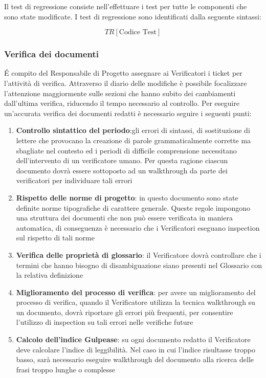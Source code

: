 Il test di regressione consiste nell’effettuare i test per tutte le
componenti che sono state modificate. I test di regressione sono
identificati dalla seguente sintassi: 

$$ TR[\text{Codice Test}] $$ 

\subsubsection{Verifica dei documenti}

\'E compito del Responsabile di Progetto assegnare ai Verificatori i ticket per l'attività di verifica. Attraverso il diario delle modifiche è possibile focalizzare l’attenzione maggiormente sulle sezioni che hanno subito dei cambiamenti dall’ultima verifica, riducendo il tempo necessario al controllo.
Per eseguire un’accurata verifica dei documenti redatti è necessario seguire i seguenti
punti:
\begin{enumerate}
	\item \textbf{Controllo sintattico del periodo}:gli errori di sintassi, di sostituzione di lettere che provocano la creazione di parole grammaticalmente corrette ma sbagliate nel
	contesto ed i periodi di difficile comprensione necessitano dell’intervento di un verificatore umano. Per questa ragione ciascun documento dovrà essere sottoposto
	ad un walkthrough da parte dei verificatori per individuare tali errori
	\item \textbf{Rispetto delle norme di progetto}: in questo documento sono state definite
	norme tipografiche di carattere generale. Queste regole impongono una struttura
	dei documenti che non può essere verificata in maniera automatica, di conseguenza è necessario che i Verificatori eseguano inspection sul rispetto di tali norme
	\item \textbf{Verifica delle proprietà di glossario}: il Verificatore dovrà controllare che
	i termini che hanno bisogno di disambiguazione siano presenti nel Glossario con la relativa definizione
	\item \textbf{Miglioramento del processo di verifica}: per avere un miglioramento del
	processo di verifica, quando il Verificatore utilizza la tecnica walkthrough su un
	documento, dovrà riportare gli errori più frequenti, per consentire l’utilizzo di
	inspection su tali errori nelle verifiche future
	\item \textbf{Calcolo dell’indice Gulpease}: su ogni documento redatto il Verificatore deve calcolare l’indice di leggibilità. Nel caso in cui l’indice risultasse troppo basso, sarà necessario eseguire walkthrough del documento alla ricerca delle frasi troppo lunghe o complesse
\end{enumerate}

